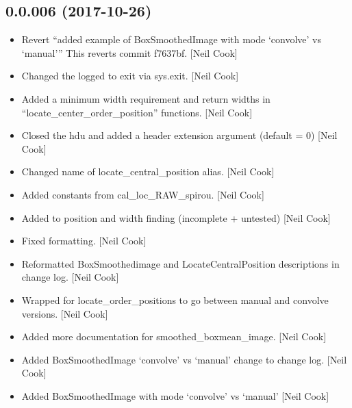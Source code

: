 \documentclass[a4paper,10pt,english]{report}
\begin{document}
\subsection{0.0.006 (2017-10-26)}
\label{\detokenize{misc/changelog:id543}}\begin{itemize}
\item {} 
Revert “added example of BoxSmoothedImage with mode ‘convolve’ vs
‘manual’” This reverts commit f7637bf. {[}Neil Cook{]}

\item {} 
Changed the logged to exit via sys.exit. {[}Neil Cook{]}

\item {} 
Added a minimum width requirement and return widths in
“locate\_center\_order\_position” functions. {[}Neil Cook{]}

\item {} 
Closed the hdu and added a header extension argument (default = 0)
{[}Neil Cook{]}

\item {} 
Changed name of locate\_central\_position alias. {[}Neil Cook{]}

\item {} 
Added constants from cal\_loc\_RAW\_spirou. {[}Neil Cook{]}

\item {} 
Added to position and width finding (incomplete + untested) {[}Neil
Cook{]}

\item {} 
Fixed formatting. {[}Neil Cook{]}

\item {} 
Reformatted BoxSmoothedimage and LocateCentralPosition descriptions in
change log. {[}Neil Cook{]}

\item {} 
Wrapped for locate\_order\_positions to go between manual and convolve
versions. {[}Neil Cook{]}

\item {} 
Added more documentation for smoothed\_boxmean\_image. {[}Neil Cook{]}

\item {} 
Added BoxSmoothedImage ‘convolve’ vs ‘manual’ change to change log.
{[}Neil Cook{]}

\item {} 
Added BoxSmoothedImage with mode ‘convolve’ vs ‘manual’ {[}Neil Cook{]}

\end{itemize}
\end{document}
